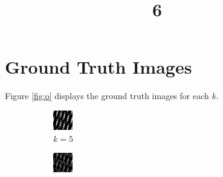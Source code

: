 \documentclass[a4paper, landscape]{article}
\title{6}
\date{}
\begin{document}
\maketitle
\section{Ground Truth Images}
Figure \ref{fig:o} displays the ground truth images for each $k$.
\begin{figure}[H]
    \centering
    \begin{subfigure}{0.09\linewidth}
        \centering
        \includegraphics[width=\linewidth]{k = 5.png}
        \caption{$k = 5$}
    \end{subfigure}
    \begin{subfigure}{0.09\linewidth}
        \centering
        \includegraphics[width=\linewidth]{k = 10.png}

\end{subfigure}
\end{figure}
\end{document}
